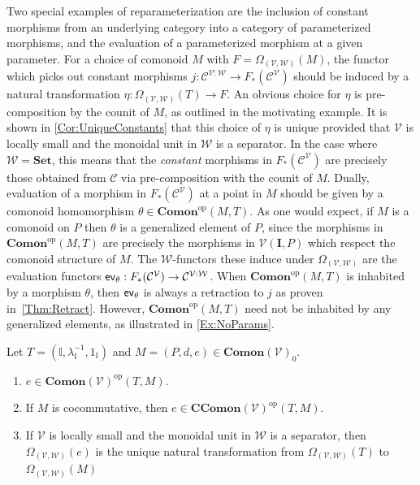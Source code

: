 Two special examples of reparameterization are the inclusion of constant morphisms from an underlying category into a category of parameterized morphisms, and the evaluation of a parameterized morphism at a given parameter.
For a choice of comonoid $M$ with $F = \Omega_{(\mathcal{V},\mathcal{W})}( M )$, the functor which picks out constant morphisms $j: \mathcal{C}^{\mathcal{V}:\mathcal{W}} \to F_*( \mathcal{C}^{\mathcal{V}} )$ should be induced by a natural transformation $\eta: \Omega_{(\mathcal{V},\mathcal{W})}( T ) \rightarrow F$.
An obvious choice for $\eta$ is pre-composition by the counit of $M$, as outlined in the motivating example.
It is shown in \cref{Cor:UniqueConstants} that this choice of $\eta$ is unique provided that $\mathcal{V}$ is locally small and the monoidal unit in $\mathcal{W}$ is a separator.
In the case where $\mathcal{W} = \mathbf{Set}$, this means that the \emph{constant} morphisms in $F_*( \mathcal{C}^{\mathcal{V}} )$ are precisely those obtained from $\mathcal{C}$ via pre-composition with the counit of $M$.
Dually, evaluation of a morphism in $F_*( \mathcal{C}^{\mathcal{V}} )$ at a point in $M$ should be given by a comonoid homomorphism $\theta \in \mathbf{Comon}^{\text{op}}( M, T )$.
As one would expect, if $M$ is a comonoid on $P$ then $\theta$ is a generalized element of $P$, since the morphisms in $\mathbf{Comon}^{\text{op}}( M, T )$ are precisely the morphisms in $\mathcal{V}( \mathbf{I}, P )$ which respect the comonoid structure of $M$.
The $\mathcal{W}$-functors these induce under $\Omega_{(\mathcal{V},\mathcal{W})}$ are the evaluation functors $\mathsf{ev}_\theta: F_*( \mathcal{C}^{\mathcal{V}} ) \to \mathcal{C}^{\mathcal{V}:\mathcal{W}}$.
When $\mathbf{Comon}^{\text{op}}( M, T )$ is inhabited by a morphism $\theta$, then $\mathsf{ev}_\theta$ is always a retraction to $j$ as proven in~\cref{Thm:Retract}.
However, $\mathbf{Comon}^{\text{op}}( M, T )$ need not be inhabited by any generalized elements, as illustrated in \cref{Ex:NoParams}.

\begin{cor}
    \label{Cor:UniqueConstants}
    Let $T = ( \mathbb{I}, \lambda_{\mathbb{I}}^{-1}, 1_{\mathbb{I}} )$ and $M = ( P, d, e ) \in \mathbf{Comon}( \mathcal{V} )_0$.
    \begin{enumerate}
    \item $e \in \mathbf{Comon}( \mathcal{V} )^{\text{op}}( T, M )$.
    \item If $M$ is cocommutative, then $e \in \mathbf{CComon}( \mathcal{V} )^{\text{op}}( T, M )$.
    \item If $\mathcal{V}$ is locally small and the monoidal unit in $\mathcal{W}$ is a separator, then $\Omega_{(\mathcal{V},\mathcal{W})}( e )$ is the unique natural transformation from $\Omega_{(\mathcal{V},\mathcal{W})}( T )$ to $\Omega_{(\mathcal{V},\mathcal{W})}( M )$
    \end{enumerate}
\end{cor}

